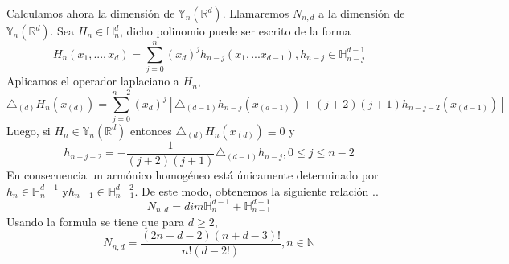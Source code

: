 Calculamos ahora la dimensión de $\mathds{Y}_n(\mathds{R}^d)$. Llamaremos $N_{n,d}$ a la dimensión de $\mathds{Y}_n(\mathds{R}^d)$.
Sea $H_{n}\in\mathds{H}_n^d$, dicho polinomio puede ser escrito de la forma
$$
H_n(x_1,...,x_d) = \sum_{j=0}^{n}(x_d)^jh_{n-j}(x_1,...x_{d-1}),		h_{n-j}\in\mathds{H}_{n-j}^{d-1}
$$
Aplicamos el operador laplaciano a $H_n$,
$$
\triangle_{(d)}H_n(x_{(d)}) = \sum_{j=0}^{n-2}(x_d)^j[\triangle_{(d-1)}h_{n-j}(x_{(d-1)})+(j+2)(j+1)h_{n-j-2}(x_{(d-1)})]
$$
Luego, si $H_n \in \mathds{Y}_n(\mathds{R}^d) $ entonces $\triangle_(d)H_n(x_{(d)}) \equiv 0$ y
$$
h_{n-j-2} = -\frac{1}{(j+2)(j+1)}\triangle_{(d-1)}h_{n-j},		0 \le j \le n-2
$$
En consecuencia un armónico homogéneo está únicamente determinado por $h_n \in \mathds{H}_n^{d-1}$ y$h_{n-1} \in \mathds{H}_{n-1}^{d-2}$. De este modo, obtenemos la siguiente relación ..
$$
N_{n,d} = dim \mathds{H}_n^{d-1}+  \mathds{H}_{n-1}^{d-1}
$$
Usando la formula se tiene que para $d\ge 2$,
$$
N_{n,d} = \frac{(2n+d-2)(n+d-3)!}{n!(d-2!)},	n\in\mathds{N}
$$
